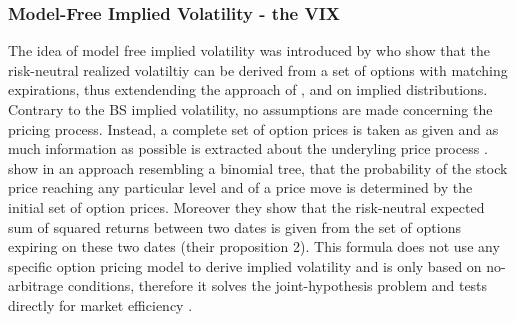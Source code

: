 \subsubsection{Model-Free Implied Volatility - the VIX}\label{sec:223VIX}
The idea of model free implied volatility was introduced by \textcite{britten2000} who show that the risk-neutral realized volatiltiy can be derived from a set of options with matching expirations, thus extendending the approach of \textcite{derman1994} \textcite{dupire1994}, \textcite{dupire1997} and \textcite{rubinstein1994} on implied distributions. Contrary to the \ac{BS} implied volatility, no assumptions are made concerning the pricing process. Instead, a complete set of option prices is taken as given and as much information as possible is extracted about the underyling price process \parencite{britten2000}. \\
\textcite{britten2000} show in an approach resembling a binomial tree, that the probability of the stock price reaching any particular level and of a price move is determined by the initial set of option prices. Moreover they show that the risk-neutral expected sum of squared returns between two dates is given from the set of options expiring on these two dates (their proposition 2). This formula does not use any specific option pricing model to derive implied volatility and is only based on no-arbitrage conditions, therefore it solves the joint-hypothesis problem and tests directly for market efficiency \parencite{jiang2003}. \\

